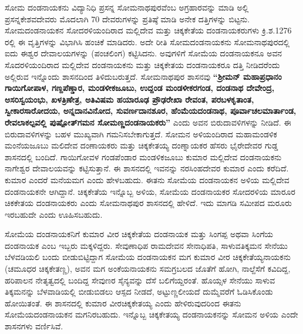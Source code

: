 ಸೋಮ ದಂಡನಾಯಕನು ವಿದ್ಯಾನಿಧಿ ಪ್ರಸನ್ನ ಸೋಮನಾಥಪುರವೆಂಬ ಅಗ್ರಹಾರವನ್ನು ಮಾಡಿ ಅಲ್ಲಿ ಪ್ರಸನ್ನ\break ಕೇಶವದೇವರು ಮೊದಲಾಗಿ 70 ದೇವರುಗಳನ್ನು ಪ್ರತಿಷ್ಠೆ ಮಾಡಿ ಅನೇಕ ದತ್ತಿಗಳನ್ನು ಬಿಟ್ಟನು. ಸೋಮದಂಡನಾಯಕನ ಸೋದರಳಿಯಂದಿರಾದ ಮಲ್ಲಿದೇವ ಮತ್ತು ಚಿಕ್ಕಕೇತೆಯ ದಂಡನಾಯಕರುಗಳು ಕ್ರಿ.ಶ.1276 ರಲ್ಲಿ ಈ ವೃತ್ತಿಗಳನ್ನು ವಿಭಾಗಿಸಿ ಹಂಚಿಕೆ ಮಾಡಿದರು. ಅದೇ ರೀತಿ ಸೋಮದಂಡನಾಯಕನು ಸೋಮನಾಥಪುರದಲ್ಲಿ ಐದು ಈಶ್ವರ ದೇವಾಲಯಗಳನ್ನು (ಪಂಚಲಿಂಗ) ಕಟ್ಟಿಸಿದನು. ಅವುಗಳಿಗೆ ಸೋಮೆಯ ದಂಡನಾಯಕನೂ ಅವನ ಸೊದರಳಿಯಂದಿರಾದ ಮಲ್ಲಿದೇವ ದಂಡನಾಯಕನು ಮತ್ತು ಚಿಕ್ಕಕೇತಯ ದಂಡನಾಯಕರೂ ದತ್ತಿ ನೀಡಿದರೆಂದು ಅಲ್ಲಿರುವ ಇನ್ನೊಂದು ಶಾಸನದಿಂದ ತಿಳಿದು\-ಬರುತ್ತದೆ. ಸೋಮನಾಥಪುರ ಶಾಸನವು \textbf{“ಶ‍್ರೀಮನ್​ ಮಹಾಪ್ರಧಾನಂ ಗಾಯಿಗೋಪಾಳ, ಗಣ್ದಪೆಣ್ಡಾರ, ಮಂಡಳೀಕಜೂಬು, ಉದ್ದಂಡ ಮಂಡಳೀಕರಗಂಡ, ದಂಡನಾಥ ದೇವೇಂದ್ರ, ಅಸರಿಸ್ವಯಂಭು, ಖಳತ್ರಿಣೇತ್ರ, ಅತಿವಿಷಮ ಹಯಾರೂಢ\general{\break } ಪ್ರೌಢರೇಖಾ ರೇವಂತ, ಪರಬಳಕೃತಾಂತ, ಸ್ವೀಕಾರಸಾರೋದಯ, ಅನ್ನದಾನವಿನೋದ, ಸುವರ್ಣದಾನಶೂರ,\general{\break } ಹೆಂಮೆಯದಂಡನಾಥ, ಪೂರ್ವಾಚಲಮಾರ್ತಾಂಡ, ರೇವಲಾಕಲ್ಪವಲ್ಲಿ ಪುಷ್ಪೋತ್​ಗಮನ ಸೋಮಣ್ಣದಂಡನಾಯಕರು” }ಎಂದು ಅವನ ಬಿರುದಾವಳಿಗಳನ್ನು ನೀಡಿದೆ. ಈ ಬಿರುದಾವಳಿಗಳನ್ನು ಬಹಳ ಮುಖ್ಯವಾಗಿ ಗಮನಿಸಬೇಕಾಗುತ್ತದೆ. ಸೋಮನ ಅಳಿಯಂದಿರಾದ ಮಹಾಮಂಡಳಿಕ ಮಂನೆಯಜೂಬು ಮಲಿದೇವ ದಂಣಾಯಕರು ಮತ್ತು ಚಿಕ್ಕಕೇತಯ್ಯ ದಂಣ್ನಾಯಕರ ಹೆಸರು ಭೈರೇದೇವರ ಗುಡ್ಡ ಶಾಸನದಲ್ಲಿ ಬಂದಿದೆ. ಗಾಯಿಗೋವಳ ಗಂಡಪೆಂಡಾರ ಮಂಡಳಿಕಜೂಬು ಕುಮಾರ ಮಲ್ಲಿದೇವ ದಂಡನಾಯಕನು ನಾಗೇಶ್ವರ ದೇವಾಲಯವನ್ನು ಕಟ್ಟಿಸುತ್ತಾನೆ. ಈ ಶಾಸನದಲ್ಲಿ ಇವನನ್ನು ನರಸಿಂಹದೇವರ ಕುಮಾರ ಎಂದು ಕರೆದಿದೆ. ಕುಮಾರ ಎಂದರೆ ಮನೆಯಮಗ ಎಂದು ಹೇಳಬಹುದು. ಈತನು ಸೋಮೆಯ ದಂಡನಾಯಕನ ಅಳಿಯ ಮಲ್ಲಿದೇವ ದಂಡನಾಯಕನೇ ಆಗಿದ್ದಾನೆ. ಚಿಕ್ಕಕೇತೆಯ ಇನ್ನೊಬ್ಬ ಅಳಿಯ, ಸೋಮೆಯ ದಂಡನಾಯಕರ ಸೋದರಳಿಯ ಮಾರೂರ ಚಿಕಕೇತಯ ದಂಡನಾಯಕರು ಎಂದು ಸೋಮನಾಥಪುರ ಶಾಸನದಲ್ಲಿ ಹೇಳಿದೆ. ಇದು ಮಾಗಡಿ ಸಮೀಪದ ಮರೂರು ಇರಬಹುದೇ ಎಂದು ಊಹಿಸಬಹುದು.

\vskip 2pt

ಸೋಮೆಯ ದಂಡನಾಯಕನಿಗೆ ಕುಮಾರ ವೀರ ಚಿಕ್ಕಕೇತೆಯ ದಂಡನಾಯಕ ಮತ್ತು ಸಿಂಗಪ್ಪ ಅಥವಾ ಸಿಂಗೆಯ ದಂಡನಾಯಕ ಎಂಬ ಇಬ್ಬರು ಮಕ್ಕಳಿದ್ದರು. ಸೇವುಣಾಧಿಪ ರಾಮದೇವನ ಸೇನಾಧಿಪತಿ, ಸಾಳುವತಿಕ್ಕಮನ ಸೇನೆಯು ಬೆಳವಡಿಯಲಿ ಬಂದು ಬೀಡುಬಿಟ್ಟಿದ್ದಾಗ ಸೋಮೆಯ ದಂಡನಾಯಕನ ಮಗ ಕುಮಾರ ವೀರ ಚಿಕ್ಕಕೇತೆಯ್ಯನಾಯಕನು (ಚಮೂಧರ ಚಿಕ್ಕಕೇತಣ್ಣ), ಅವನ ಮಗ ಅಂಕೆಯನಾಯಕನು ಸಮಗ್ರಬಲದ ಜೊತೆಗೆ ಹೋಗಿ, ನಾಲ್ದೆಸೆಗೆ ಕವಿದಿದ್ದ, ಹರಿಪಾಲನ ನೇತೃತ್ವದಲ್ಲಿ ಬಂದಿದ್ದ ಸೇವುಣರ ಸೈನ್ಯವನ್ನು ದೆಸೆ ಬಲಿಗೆಯ್ದರಂತೆ. ಹೊಯ್ಸಳ ಸೇನೆಯು ಸಾಳುವ ತಿಕ್ಕಮನನ್ನು ಬೆಳವಾಡಿಯಲ್ಲಿ ಬೀಡುಬಿಡಲು ಆಸ್ಪದ ನೀಡದೆ, ಅಟ್ಟುಣ್ಣಲೀಯದೆ ದುಮ್ಮೆವರೆಗೆ ಓಡಿಸಿಕೊಂಡು ಹೋಯಿತಂತೆ. ಈ ಶಾಸನದಲ್ಲಿ ಕುಮಾರ ವೀರಚಿಕ್ಕಕೇತಯ್ಯ ಎಂದು ಹೇಳಿರುವುದರಿಂದ ಈತನು ಸೋಮೆಯದಂಡನಾಯಕನ ಮಗನಿರಬಹುದು. ಇನ್ನೊಬ್ಬ ಚಿಕ್ಕಕೇತಯ್ಯ ದಂಡನಾಯಕನನ್ನು ಸೋಮನ ಅಳಿಯ ಎಂದೇ ಶಾಸನಗಳು ವರ್ಣಿಸಿವೆ.

